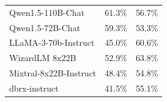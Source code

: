\documentclass{article}
\begin{document}
\begin{table}[t]
\begin{minipage}[t]{0.49\linewidth}
\begin{tabular}{@{}lcc@{}}
            Qwen1.5-110B-Chat       &   61.3\%     & 56.7\%          \\
            Qwen1.5-72B-Chat        &   59.3\%     & 53.3\%          \\
            LLaMA-3-70b-Instruct    &   45.0\%     & 60.6\%           \\
            WizardLM 8x22B          &   52.9\%     & 63.8\%          \\
            Mixtral-8x22B-Instruct  &   48.4\%     & 54.8\%          \\
            dbrx-instruct           &   41.5\%     & 55.1\%         \\
            \bottomrule
            \end{tabular}
        \label{tab:proposers_vs_aggregators}
    \end{minipage}
\end{table}


\end{document}
